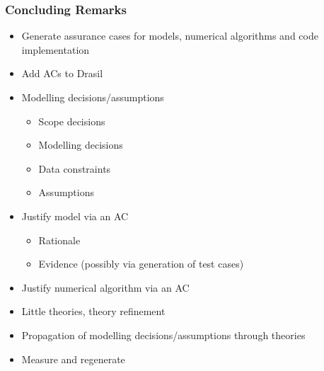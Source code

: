 \documentclass{beamer}
\begin{document}
\begin{frame}

\frametitle{Concluding Remarks}

\begin{itemize}
\item Generate assurance cases for models, numerical algorithms and code implementation
\item Add ACs to Drasil
\item Modelling decisions/assumptions
\begin{itemize}
  \item Scope decisions
  \item Modelling decisions
  \item Data constraints
  \item Assumptions
\end{itemize}
\item Justify model via an AC
\begin{itemize}
  \item Rationale
  \item Evidence (possibly via generation of test cases)
\end{itemize}
\item Justify numerical algorithm via an AC
\item Little theories, theory refinement
\item Propagation of modelling decisions/assumptions through theories
\item Measure and regenerate
\end{itemize}

\end{frame}

\end{document}
